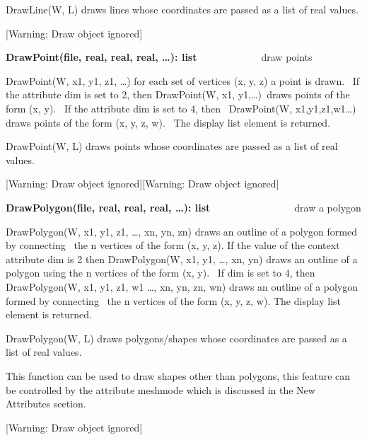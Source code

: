 \documentclass[letterpaper]{article}
\begin{document}
\bigskip

{
DrawLine(W, L) draws lines whose coordinates are passed as a list of real values.}

[Warning: Draw object ignored]

{
\textsf{\textbf{DrawPoint(file, real, real, real, {\dots}): list}}\ \ \ \ \ \ \ \ \ \  \ \ \ draw points}


\bigskip

{
\textsf{DrawPoint(W, x1, y1, z1, {\dots})} for each set of vertices (x, y, z) a point is drawn. \ If the attribute
\textsf{dim} is set to 2, then \textsf{DrawPoint(W, x1, y1,{\dots})}\texttt{ }draws points of the form (x, y). \ If the
attribute \textsf{dim} is set to 4, then \ \textsf{DrawPoint(W, x1,y1,z1,w1{\dots}) }draws points of the form (x, y, z,
w). \ The display list element is returned.}


\bigskip

{
DrawPoint(W, L) draws points whose coordinates are passed as a list of real values.}

[Warning: Draw object ignored][Warning: Draw object ignored]

{
\textsf{\textbf{DrawPolygon(file, real, real, real, {\dots}): list}}\ \ \ \ \ \ \ \  \ \ \ \ \ \ \ \ \ draw a polygon}


\bigskip

{
\textsf{DrawPolygon(W, x1, y1, z1, {\dots}, xn, yn, zn)} draws an outline of a polygon formed by connecting \ the n
vertices of the form (x, y, z). If the value of the context attribute \textsf{dim }is 2 then \textsf{DrawPolygon(W, x1,
y1, {\dots}, xn, yn)} draws an outline of a polygon using the n vertices of the form (x, y). \ If \textsf{dim} is set
to 4, then \textsf{DrawPolygon(W, x1, y1, z1, w1 {\dots}, xn, yn, zn, wn)} draws an outline of a polygon formed by
connecting \ the n vertices of the form (x, y, z, w). The display list element is returned.}

{
DrawPolygon(W, L) draws polygons/shapes whose coordinates are passed as a list of real values.}


\bigskip

{
This function can be used to draw shapes other than polygons, this feature can be controlled by the attribute
\textsf{meshmode} which is discussed in the New Attributes section.}

[Warning: Draw object ignored]
\end{document}
